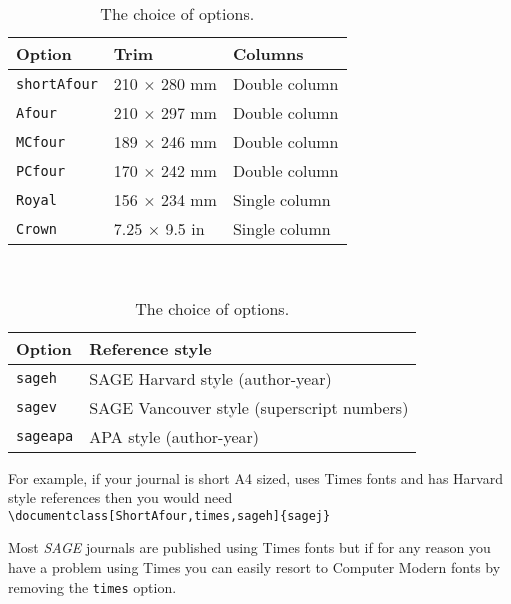 \documentclass[Afour,sageh,times,doublespace]{sagej}
\begin{document}
\begin{table}[h]
\small\sf\centering
\caption{The choice of options.\label{T1}}
\begin{tabular}{lll}
\toprule
Option&Trim&Columns\\
\midrule
\texttt{shortAfour}& 210 $\times$ 280 mm& Double column\\
\texttt{Afour} &210 $\times$ 297 mm& Double column\\
\texttt{MCfour} &189 $\times$ 246 mm& Double column\\
\texttt{PCfour} &170 $\times$ 242 mm& Double column\\
\texttt{Royal} &156 $\times$ 234 mm& Single column\\
\texttt{Crown} &7.25 $\times$ 9.5 in&Single column\\
\bottomrule
\end{tabular}\\[10pt]
\begin{tabular}{ll}
\toprule
Option&Reference style\\
\midrule
\texttt{sageh}&SAGE Harvard style (author-year)\\
\texttt{sagev}&SAGE Vancouver style (superscript numbers)\\
\texttt{sageapa}&APA style (author-year)\\
\bottomrule
\end{tabular}
\end{table}

For example, if your journal is short A4 sized, uses Times fonts and has Harvard style references then you would need\\
{\small\verb+\documentclass[ShortAfour,times,sageh]{sagej}+}

Most \textit{SAGE} journals are published using Times fonts but if for any reason you have a problem using Times you can
easily resort to Computer Modern fonts by removing the
\verb"times" option.
\end{document}
